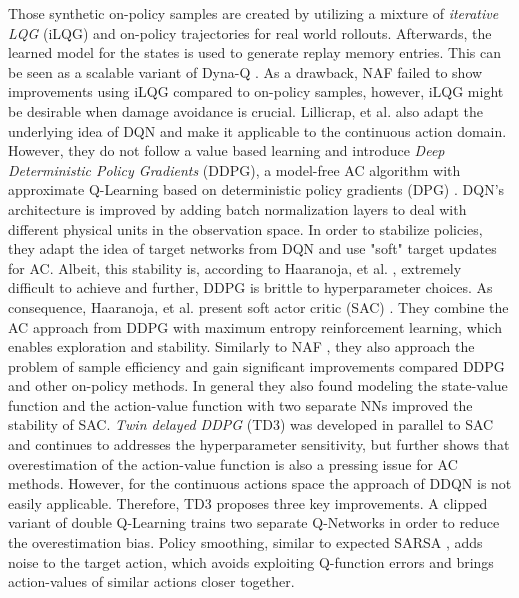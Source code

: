 	Those synthetic on-policy samples are created by utilizing a mixture of \textit{iterative LQG} (iLQG) \cite{Todorov2005} and on-policy trajectories for real world rollouts.
	Afterwards, the learned model for the states is used to generate replay memory entries. 
	This can be seen as a scalable variant of Dyna-Q \cite{Sutton1990}. 
	As a drawback, NAF failed to show improvements using iLQG compared to on-policy samples, however, iLQG might be desirable when damage avoidance is crucial. 
	Lillicrap, et al. \cite{Lillicrap2016} also adapt the underlying idea of DQN \cite{Mnih2015} and make it applicable to the continuous action domain. 
	However, they do not follow a value based learning and introduce \textit{Deep Deterministic Policy Gradients} (DDPG), a model-free AC algorithm with approximate Q-Learning based on deterministic policy gradients (DPG) \cite{Silver2014}.
	DQN's \cite{Mnih2015} architecture is improved by adding batch normalization layers \cite{Ioffe2015} to deal with different physical units in the observation space. 
	In order to stabilize policies, they adapt the idea of target networks from DQN \cite{Mnih2015} and use "soft" target updates for AC. 
	Albeit, this stability is, according to Haaranoja, et al. \cite{Haarnoja2018}, extremely difficult to achieve and further, DDPG is brittle to hyperparameter choices. 
	As consequence, Haaranoja, et al. present soft actor critic (SAC) \cite{Haarnoja2018}.
	They combine the AC approach from DDPG \cite{Lillicrap2016} with maximum entropy reinforcement learning, which enables exploration and stability. 
	Similarly to NAF \cite{Gu2016}, they also approach the problem of sample efficiency and gain significant improvements compared DDPG and other on-policy methods.
	In general they also found modeling the state-value function and the action-value function with two separate NNs improved the stability of SAC. 
	\textit{Twin delayed DDPG} (TD3) \cite{Fujimoto2018} was developed in parallel to SAC and continues to addresses the hyperparameter sensitivity, but further shows that overestimation of the action-value function is also a pressing issue for AC methods. 
	However, for the continuous actions space the approach of DDQN \cite{VanHasselt2016} is not easily applicable.
	Therefore, TD3 proposes three key improvements.
	A clipped variant of double Q-Learning \cite{VanHasselt2010} trains two separate Q-Networks in order to reduce the overestimation bias.
	Policy smoothing, similar to expected SARSA \cite{VanSeijen2009}, adds noise to the target action, which avoids exploiting Q-function errors and brings action-values of similar actions closer together.
